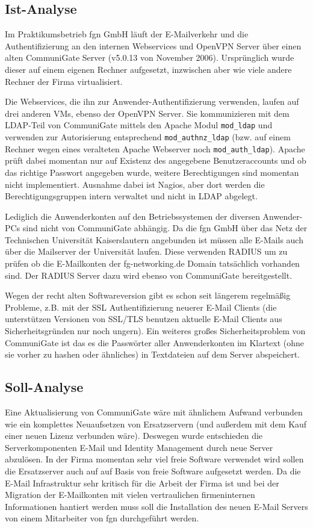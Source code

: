 \documentclass[11pt,a4paper,titlepage=firstiscover]{scrartcl} %
\begin{document}
\subsection{Ist-Analyse}
Im Praktikumsbetrieb fgn GmbH läuft der E-Mailverkehr und die Authentifizierung an den internen Webservices und OpenVPN Server über einen alten CommuniGate Server (v5.0.13 von November 2006). Ursprünglich wurde dieser auf einem eigenen Rechner aufgesetzt, inzwischen aber wie viele andere Rechner der Firma virtualisiert. 

Die Webservices, die ihn zur Anwender-Authentifizierung verwenden, laufen auf drei anderen VMs, ebenso der OpenVPN Server. Sie kommunizieren mit dem LDAP-Teil von CommuniGate mittels den Apache Modul \texttt{mod\_ldap} und verwenden zur Autorisierung entsprechend \texttt{mod\_authnz\_ldap} (bzw. auf einem Rechner wegen eines veralteten Apache Webserver noch \texttt{mod\_auth\_ldap}). Apache prüft dabei momentan nur auf Existenz des angegebene Benutzeraccounts und ob das richtige Passwort angegeben wurde, weitere Berechtigungen sind momentan nicht implementiert. Ausnahme dabei ist Nagios, aber dort werden die Berechtigungsgruppen intern verwaltet und nicht in LDAP abgelegt.

Lediglich die Anwenderkonten auf den Betriebssystemen der diversen Anwender-PCs sind nicht von CommuniGate abhängig. Da die fgn GmbH über das Netz der Technischen Universität Kaiserslautern angebunden ist müssen alle E-Mails auch über die Mailserver der Universität laufen. Diese verwenden RADIUS um zu prüfen ob die E-Mailkonten der fg-networking.de Domain tatsächlich vorhanden sind. Der RADIUS Server dazu wird ebenso von CommuniGate bereitgestellt. 

Wegen der recht alten Softwareversion gibt es schon seit längerem regelmä\ss{}ig Probleme, z.B. mit der SSL Authentifizierung neuerer E-Mail Clients (die unterstützen Versionen von SSL/TLS benutzen aktuelle E-Mail Clients aus Sicherheitsgründen nur noch ungern). Ein weiteres gro\ss{}es Sicherheitsproblem von CommuniGate ist das es die Passwörter aller Anwenderkonten im Klartext (ohne sie vorher zu hashen oder ähnliches) in Textdateien auf dem Server abspeichert.

\subsection{Soll-Analyse}
Eine Aktualisierung von CommuniGate wäre mit ähnlichem Aufwand verbunden wie ein komplettes Neuaufsetzen von Ersatzservern (und au\ss{}erdem mit dem Kauf einer neuen Lizenz verbunden wäre). Deswegen wurde entschieden die Serverkomponenten E-Mail und Identity Management durch neue Server abzulösen. In der Firma momentan sehr viel freie Software verwendet wird sollen die Ersatzserver auch auf auf Basis von freie Software aufgesetzt werden. Da die E-Mail Infrastruktur sehr kritisch für die Arbeit der Firma ist und bei der Migration der E-Mailkonten mit vielen vertraulichen firmeninternen Informationen hantiert werden muss soll die Installation des neuen E-Mail Servers von einem Mitarbeiter von fgn durchgeführt werden.
\end{document}

